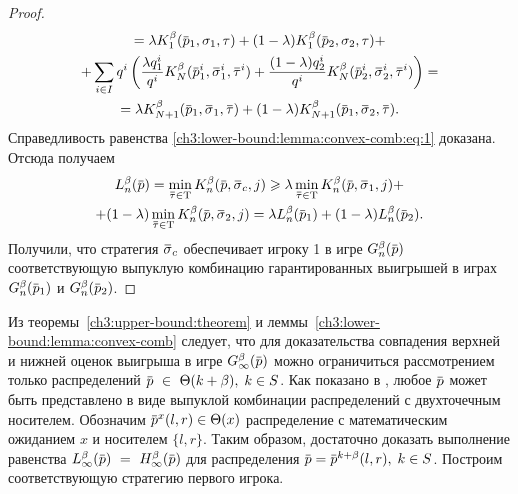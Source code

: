 {\begin{proof}
\begin{gather*}
    = \lambda \K[1](\p_1, \sigma_1, \tau) +
    (1-\lambda) \K[1](\p_2, \sigma_2, \tau) + \\
    + \sum_{i \in I} q^i \left(
      \frac{\lambda q^i_1}{q^i} \K[N](\p^i_1, \sigmav^i_1, \tauv^i) +
      \frac{(1-\lambda) q^i_2}{q^i} \K[N](\p^i_2, \sigmav^i_2, \tauv^i)
    \right) = \\
    = \lambda \K[N+1](\p_1, \sigmav_1, \tauv) +
    (1-\lambda)\K[N+1](\p_1, \sigmav_2, \tauv).
  \end{gather*}
  Справедливость равенства \eqref{ch3:lower-bound:lemma:convex-comb:eq:1} доказана.
  Отсюда получаем
  \begin{multline*}
    \Low[n](\p) = \min_{\tauv \in \Tau} \K[n](\p, \sigmav_c, j) \geqslant
    \lambda \min_{\tauv \in \Tau} \K[n](\p, \sigmav_1, j) + \\
    + (1-\lambda) \min_{\tauv \in \Tau} \K[n](\p, \sigmav_2, j) =
    \lambda \Low[n](\p_1) + (1-\lambda) \Low[n](\p_2).
  \end{multline*}
  Получили, что стратегия $\sigmav_c$ обеспечивает игроку 1 в игре $\theG[n](\p)$ соответствующую выпуклую комбинацию гарантированных выигрышей в играх $\theG[n](\p_1)$ и $\theG[n](\p_2)$.
\end{proof}

Из теоремы~\ref{ch3:upper-bound:theorem} и леммы~\ref{ch3:lower-bound:lemma:convex-comb} следует, что для доказательства совпадения верхней и нижней оценок выигрыша в игре $\theG[\infty](\p)$ можно ограничиться рассмотрением только распределений $\p~\in~\Theta(k + \beta), \; k \in S$.
Как показано в \cite{domansky11}, любое $\p$ может быть представлено в виде выпуклой комбинации распределений с двухточечным носителем.
Обозначим $\p^x(l, r) \in \Theta(x)$ распределение с математическим ожиданием $x$ и носителем $\{l, r\}$.
Таким образом, достаточно доказать выполнение равенства $\Low(\p)~=~\High(\p)$ для распределения $\p = \p^{k+\beta}(l,r), \; k \in S$.
Построим соответствующую стратегию первого игрока.

}
